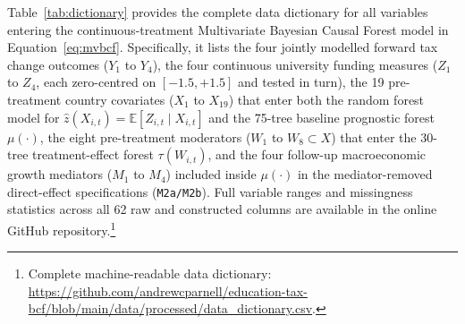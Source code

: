 \documentclass[11pt,a4paper]{article}
\begin{document}
Table~\ref{tab:dictionary} provides the complete data dictionary for all variables entering the continuous-treatment Multivariate Bayesian Causal Forest model in Equation~\eqref{eq:mvbcf}. Specifically, it lists the four jointly modelled forward tax change outcomes ($Y_1$ to $Y_4$), the four continuous university funding measures ($Z_1$ to $Z_4$, each zero-centred on $[-1.5, +1.5]$ and tested in turn), the 19 pre-treatment country covariates ($X_1$ to $X_{19}$) that enter both the random forest model for $\hat{z}(X_{i,t}) = \mathbb{E}[Z_{i,t} \mid X_{i,t}]$ and the 75-tree baseline prognostic forest $\mu(\cdot)$, the eight pre-treatment moderators ($W_1$ to $W_8 \subset X$) that enter the 30-tree treatment-effect forest $\tau(W_{i,t})$, and the four follow-up macroeconomic growth mediators ($M_1$ to $M_4$) included inside $\mu(\cdot)$ in the mediator-removed direct-effect specifications (\texttt{M2a/M2b}). Full variable ranges and missingness statistics across all 62 raw and constructed columns are available in the online GitHub repository.\footnote{\raggedright Complete machine-readable data dictionary: \url{https://github.com/andrewcparnell/education-tax-bcf/blob/main/data/processed/data_dictionary.csv}.}
\end{document}
